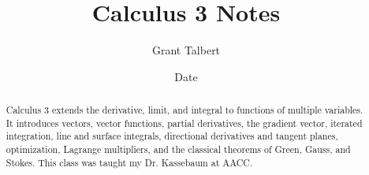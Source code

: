 \documentclass[12pt, letterpaper]{report}
\title{Calculus 3 Notes}
\author{Grant Talbert}
\date{Date}
\begin{document}
	\maketitle
	
	\begin{abstract}
		Calculus 3 extends the derivative, limit, and integral to functions of multiple variables. It introduces vectors, vector functions, partial derivatives, the gradient vector, iterated integration, line and surface integrals, directional derivatives and tangent planes, optimization, Lagrange multipliers, and the classical theorems of Green, Gauss, and Stokes. This class was taught my Dr. Kassebaum at AACC.
	\end{abstract}
	
	\newpage
	
	\tableofcontents
	
	\newpage

\end{document}
